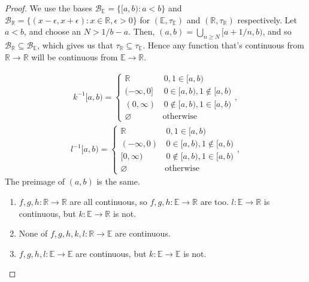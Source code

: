 \documentclass[12pt]{extarticle}
\newcommand{\set}[1]{\{#1\}}
\newcommand{\R}{\mathbb{R}}
\newcommand{\<}{\langle}
\renewcommand{\>}{\rangle}
\renewcommand{\emptyset}{\varnothing}
\theoremstyle{definition}
\begin{document}
\begin{proof}
  We use the bases $\mathcal{B}_{\mathbb{E}} = \set{[a,b): a<b}$ and $\mathcal{B}_{\mathbb{R}} = \set{(x-\epsilon,x+\epsilon): x \in \R, \epsilon>0}$ for $(\mathbb{E}, \tau_\mathbb{E})$ and $(\mathbb{R}, \tau_\mathbb{R})$ respectively.
    Let $a<b$, and choose an $N > 1/b-a$. Then, $(a,b) = \bigcup\limits_{n \geq N}[a+1/n,b)$, and so $\mathcal{B}_{\mathbb{R}} \subseteq \mathcal{B}_{\mathbb{E}}$, which gives us that $\tau_\mathbb{R} \subseteq \tau_\mathbb{E}$. Hence any function that's continuous from $\R \to \R$ will be continuous from $\mathbb{E} \to \mathbb{R}$.
      
      \begin{align*}
        k^{-1}[a,b) =
          \begin{cases}
            \R \quad & \, 0,1 \in [a,b) \\
              (-\infty,0] & \, 0 \in [a,b), 1 \not \in [a,b) \\
                (0,\infty) & \, 0 \not \in [a,b), 1 \in [a,b) \\
                    \emptyset \, &\text{otherwise} 
          \end{cases},
      \end{align*}
      \begin{align*}
        l^{-1}[a,b) =
          \begin{cases}
            \R \quad & \, 0,1 \in [a,b) \\
              (-\infty,0) & \, 0 \in [a,b), 1 \not \in [a,b) \\
                  [0,\infty) & \, 0 \not \in [a,b), 1 \in [a,b) \\
                        \emptyset \, &\text{otherwise} 
          \end{cases},
      \end{align*}
      The preimage of $(a,b)$ is the same.

      \begin{enumerate}
      \item
        $f,g,h: \R \to \R$ are all continuous, so $f,g,h: \mathbb{E} \to \R$ are too. $l: \mathbb{E} \to \mathbb{R}$ is continuous,
        but $k: \mathbb{E} \to \mathbb{R}$ is not.
      \item
        None of $f,g,h,k,l: \R \to \mathbb{E}$ are continuous.
      \item
        $f,g,h,l: \mathbb{E} \to \mathbb{E}$ are continuous, but $k: \mathbb{E} \to \mathbb{E}$ is not.
      \end{enumerate}
\end{proof}
\end{document}

